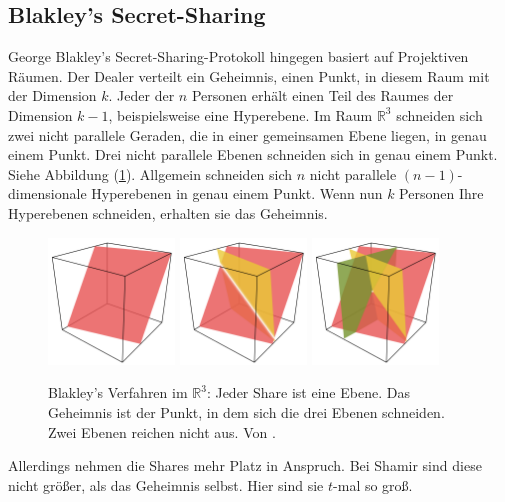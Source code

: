 \documentclass[12pt, a4paper, oneside, titlepage]{report}
\newcommand{\R}{\mathds{R}}
\theoremstyle{definition}
\begin{document}
	\subsection{Blakley's Secret-Sharing}
		George Blakley's Secret-Sharing-Protokoll hingegen basiert auf Projektiven Räumen. Der Dealer verteilt ein Geheimnis, einen Punkt, in diesem Raum mit der Dimension $ k $. Jeder der $ n $ Personen erhält einen Teil des Raumes der Dimension $ k-1 $, beispielsweise eine Hyperebene. Im Raum $ \R^3 $ schneiden sich zwei nicht parallele Geraden, die in einer gemeinsamen Ebene liegen, in genau einem Punkt. Drei nicht parallele Ebenen schneiden sich in genau einem Punkt. Siehe Abbildung (\ref{bsp:blackley}). Allgemein schneiden sich $ n $ nicht parallele $ (n-1) $-dimensionale Hyperebenen in genau einem Punkt. Wenn nun $ k $ Personen Ihre Hyperebenen schneiden, erhalten sie das Geheimnis. \cite{blakley}\cite{quantum}
		\begin{figure}[H]
			\centering
			\includegraphics[width=0.3\textwidth]{images/blakley1.png}
			\includegraphics[width=0.3\textwidth]{images/blakley2.png}
			\includegraphics[width=0.3\textwidth]{images/blakley3.png}
			\caption{Blakley's Verfahren im $ \R^3 $: Jeder Share ist eine Ebene. Das Geheimnis ist der Punkt, in dem sich die drei Ebenen schneiden. Zwei Ebenen reichen nicht aus. Von \cite{blakley-images}.}
			\label{bsp:blackley}
		\end{figure}
		\noindent
		Allerdings nehmen die Shares mehr Platz in Anspruch. Bei Shamir sind diese nicht größer, als das Geheimnis selbst. Hier sind sie $ t $-mal so groß. \cite{blakley}
\end{document}
